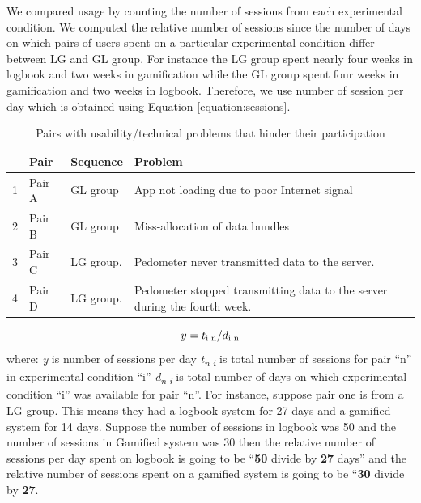 \documentclass{sig-alternate}
\def\SB#1{\textsubscript{\textcolor{black}{#1}}}
\begin{document}
We compared usage by counting the number of sessions from each experimental condition. We computed the relative number of sessions since the number of days on which pairs of users spent on a particular experimental condition differ between LG and GL group. For instance the LG group spent nearly four weeks in logbook and two weeks in gamification while the GL group spent four weeks in gamification and two weeks in logbook. Therefore, we use number of session per day which is obtained using Equation \ref{equation:sessions}.\newline
\begin{table}[h!]
  \begin{center}
    \caption{Pairs with usability/technical problems that hinder their participation}
    \label{table:usageproblems}
	\begin{tabular}{|l|p{1cm}|p{2cm}|p{3.5cm}|}
		\hline
		&Pair&Sequence&Problem\\
		\hline
		1&Pair A&GL group &App not loading due to poor Internet signal\\
		\hline
		2&Pair B&GL group& Miss-allocation of data bundles  \\
		\hline
		3&Pair C & LG group.& Pedometer never transmitted data to the server.\\
		\hline
		4&Pair D & LG group.& Pedometer stopped transmitting data to the server during the fourth week.\\
	\hline
	\end{tabular}
  \end{center}
\end{table}
\begin{equation}
\label{equation:sessions}
y=t\SB{i n}/d\SB{i n}
\end{equation} \newline
where:\newline
\emph{y} is number of sessions per day\newline
\emph{t\SB{n i}} is total number of sessions for pair ``n'' in experimental condition ``i''\newline
\emph{d\SB{n i}} is total number of days on which experimental condition ``i'' was available for pair ``n''.\newline
For instance, suppose pair one is from a LG group. This means they had  a logbook system for 27 days and a gamified system for 14 days. Suppose the number of sessions in logbook was 50 and the number of sessions in Gamified system was 30 then the relative number of sessions per day spent on logbook is going to be ``\textbf{50} divide by \textbf{27} days'' and the relative number of sessions spent on  a gamified system is going to be ``\textbf{30} divide by \textbf{27}.\newline
\end{document}

